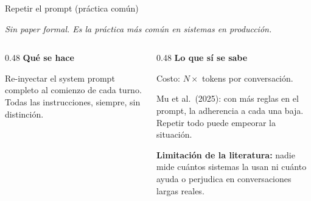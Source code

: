 \documentclass[aspectratio=169, 11pt]{beamer}
\begin{document}
\begin{frame}{Repetir el prompt (pr\'actica com\'un)}

\textit{Sin paper formal. Es la pr\'actica m\'as com\'un en sistemas en producci\'on.}

\vspace{0.8em}

\begin{columns}[T]
\begin{column}{0.48\textwidth}
\textbf{Qu\'e se hace}

\vspace{0.3em}
\footnotesize
Re-inyectar el system prompt completo al comienzo de cada turno. Todas las instrucciones, siempre, sin distinci\'on.
\end{column}

\begin{column}{0.48\textwidth}
\textbf{Lo que s\'i se sabe}

\vspace{0.3em}
\footnotesize
Costo: $N\times$ tokens por conversaci\'on.

\vspace{0.6em}

Mu et al.\ (2025): con m\'as reglas en el prompt, la adherencia a cada una baja. Repetir todo puede \alert{empeorar} la situaci\'on.

\vspace{0.6em}

\textbf{Limitaci\'on de la literatura:} nadie mide cu\'antos sistemas la usan ni cu\'anto ayuda o perjudica en conversaciones largas reales.
\end{column}
\end{columns}

\end{frame}
\end{document}
